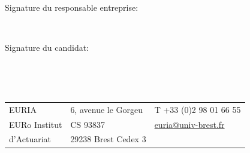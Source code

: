 \documentclass[a4paper,11pt,twoside] {book}
\def\TitreAdjust{4.6mm} 				%
\begin{document}
\begin{titlepage}
\begin{minipage}[c][0.5cm][t]{0.48\textwidth}
Signature du responsable entreprise:
\end{minipage}
~%
\begin{minipage}[c][0.5cm][t]{0.48\textwidth}
Signature du candidat:
\end{minipage}
\vspace{\TitreAdjust}
~%
~%
\begin{minipage}[c][1cm][c]{0.083\textwidth}
\hfill
\end{minipage}
~%
\vspace{\TitreAdjust}



\begin{flushright}
\scriptsize{
\begin{tabular}{|m{40mm}|m{40mm}|m{40mm}}
EURIA & 6, avenue le Gorgeu & T +33 (0)2 98 01 66 55  \\
 EURo Institut  & CS 93837 &  \href{mailto:euria@univ-brest.fr}{euria@univ-brest.fr}   \\
 d'Actuariat & 29238 Brest Cedex 3 & \\
	\end{tabular}}
\end{flushright}

\newpage
\thispagestyle{empty}

\end{titlepage}
\end{document}
